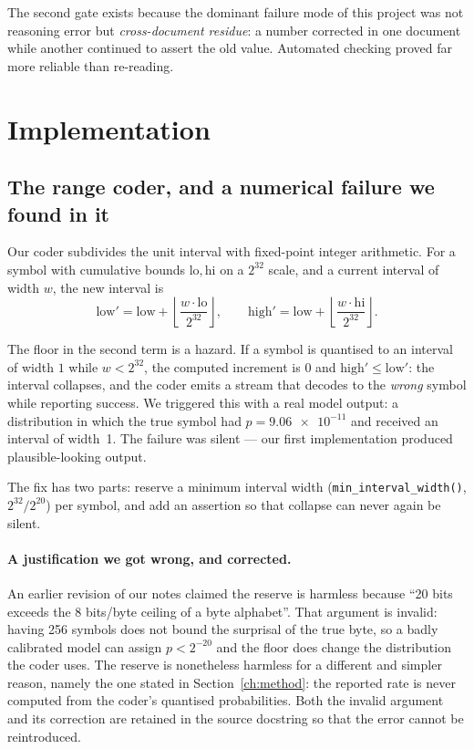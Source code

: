\documentclass[11pt,a4paper]{article}
\newcommand{\code}[1]{\texttt{\small #1}}
\begin{document}
The second gate exists because the dominant failure mode of this project was not
reasoning error but \emph{cross-document residue}: a number corrected in one
document while another continued to assert the old value. Automated checking
proved far more reliable than re-reading.

\section{Implementation}
\label{ch:impl}

\subsection{The range coder, and a numerical failure we found in it}
\label{sec:coder}

Our coder subdivides the unit interval with fixed-point integer arithmetic. For a
symbol with cumulative bounds $\mathrm{lo},\mathrm{hi}$ on a $2^{32}$ scale, and a
current interval of width $w$, the new interval is
\begin{equation}
\mathrm{low}' = \mathrm{low} + \left\lfloor \frac{w\cdot \mathrm{lo}}{2^{32}}
\right\rfloor,\qquad
\mathrm{high}' = \mathrm{low} + \left\lfloor \frac{w\cdot \mathrm{hi}}{2^{32}}
\right\rfloor .
\end{equation}

The floor in the second term is a hazard. If a symbol is quantised to an interval
of width $1$ while $w < 2^{32}$, the computed increment is $0$ and
$\mathrm{high}' \le \mathrm{low}'$: the interval collapses, and the coder emits a
stream that decodes to the \emph{wrong} symbol while reporting success. We
triggered this with a real model output: a distribution in which the true symbol
had $p = \num{9.06e-11}$ and received an interval of width~1. The failure was
silent --- our first implementation produced plausible-looking output.

The fix has two parts: reserve a minimum interval width
(\code{min\_interval\_width()}, $2^{32}/2^{20}$) per symbol, and add an
assertion so that collapse can never again be silent.

\paragraph{A justification we got wrong, and corrected.} An earlier revision of
our notes claimed the reserve is harmless because ``20 bits exceeds the 8
bits/byte ceiling of a byte alphabet''. That argument is invalid: having 256
symbols does not bound the surprisal of the true byte, so a badly calibrated
model can assign $p < 2^{-20}$ and the floor does change the distribution the
coder uses. The reserve is nonetheless harmless for a different and simpler
reason, namely the one stated in Section~\ref{ch:method}: the reported rate is
never computed from the coder's quantised probabilities. Both the invalid
argument and its correction are retained in the source docstring so that the
error cannot be reintroduced.
\end{document}
